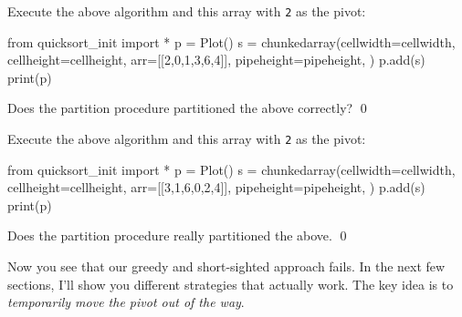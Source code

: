 \newpage
\begin{ex}
Execute the above algorithm and this array
with \verb!2! as the pivot:
\begin{python}
from quicksort_init import *
p = Plot()
s = chunkedarray(cellwidth=cellwidth, 
                   cellheight=cellheight,
                   arr=[[2,0,1,3,6,4]],
                   pipeheight=pipeheight,
)
p.add(s)
print(p)
\end{python}
Does the partition procedure partitioned the above correctly?
\qed
\end{ex}



\newpage
\begin{ex}
Execute the above algorithm and this array
with \verb!2! as the pivot:
\begin{python}
from quicksort_init import *
p = Plot()
s = chunkedarray(cellwidth=cellwidth, 
                   cellheight=cellheight,
                   arr=[[3,1,6,0,2,4]],
                   pipeheight=pipeheight,
)
p.add(s)
print(p)
\end{python}
Does the partition procedure really partitioned the above.
\qed
\end{ex}


\newpage
Now you see that our greedy and short-sighted approach 
fails.
In the next few sections, I'll show you different strategies that
actually work.
The key idea is to \textit{temporarily move the pivot out of the way}.
